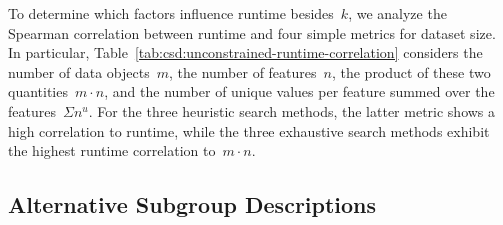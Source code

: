 \documentclass[acmsmall]{acmart} %
\theoremstyle{acmplain}
\theoremstyle{acmdefinition}
\begin{document}
To determine which factors influence runtime besides~$k$, we analyze the Spearman correlation between runtime and four simple metrics for dataset size.
In particular, Table~\ref{tab:csd:unconstrained-runtime-correlation} considers the number of data objects~$m$, the number of features~$n$, the product of these two quantities~$m \cdot n$, and the number of unique values per feature summed over the features~$\Sigma n^u$.
For the three heuristic search methods, the latter metric shows a high correlation to runtime, while the three exhaustive search methods exhibit the highest runtime correlation to~$m \cdot n$.

\subsection{Alternative Subgroup Descriptions}
\label{sec:csd:evaluation:alternatives}
\end{document}
